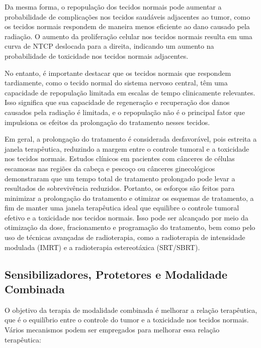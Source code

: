 \documentclass[11pt,a4paper]{article}
\begin{document}
	Da mesma forma, o repopulação dos tecidos normais pode aumentar a probabilidade de complicações nos tecidos saudáveis adjacentes ao tumor, como os tecidos normais respondem de maneira menos eficiente ao dano causado pela radiação. O aumento da proliferação celular nos tecidos normais resulta em uma curva de NTCP deslocada para a direita, indicando um aumento na probabilidade de toxicidade nos tecidos normais adjacentes.

	No entanto, é importante destacar que os tecidos normais que respondem tardiamente, como o tecido normal do sistema nervoso central, têm uma capacidade de repopulação limitada em escalas de tempo clinicamente relevantes. Isso significa que sua capacidade de regeneração e recuperação dos danos causados pela radiação é limitada, e o repopulação não é o principal fator que impulsiona os efeitos da prolongação do tratamento nesses tecidos.

	Em geral, a prolongação do tratamento é considerada desfavorável, pois estreita a janela terapêutica, reduzindo a margem entre o controle tumoral e a toxicidade nos tecidos normais. Estudos clínicos em pacientes com cânceres de células escamosas nas regiões da cabeça e pescoço ou cânceres ginecológicos demonstraram que um tempo total de tratamento prolongado pode levar a resultados de sobrevivência reduzidos. Portanto, os esforços são feitos para minimizar a prolongação do tratamento e otimizar os esquemas de tratamento, a fim de manter uma janela terapêutica ideal que equilibre o controle tumoral efetivo e a toxicidade nos tecidos normais. Isso pode ser alcançado por meio da otimização da dose, fracionamento e programação do tratamento, bem como pelo uso de técnicas avançadas de radioterapia, como a radioterapia de intensidade modulada (IMRT) e a radioterapia estereotáxica (SRT/SBRT).

\subsection*{Sensibilizadores, Protetores e Modalidade Combinada}

	O objetivo da terapia de modalidade combinada é melhorar a relação terapêutica, que é o equilíbrio entre o controle do tumor e a toxicidade nos tecidos normais. Vários mecanismos podem ser empregados para melhorar essa relação terapêutica:
\end{document}
